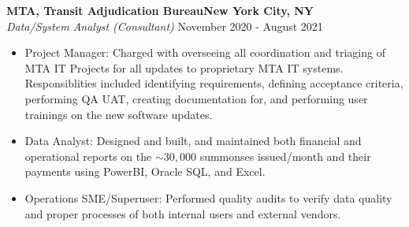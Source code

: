 \documentclass[a4paper]{article}
\begin{document}
\textbf{MTA, Transit Adjudication Bureau\hfill New York City, NY}\\
\textit{Data/System Analyst (Consultant)} \hfill November 2020 - August 2021\\
\vspace{-1mm}
\begin{itemize} \itemsep 1pt
    \item Project Manager: Charged with overseeing all coordination and triaging of MTA IT Projects for all updates to proprietary MTA IT systems.
            Responsiblities included identifying requirements, defining acceptance criteria, performing QA UAT, creating documentation for, and performing user trainings on the new software updates.
	\item Data Analyst: Designed and built, and maintained both financial and operational reports on the $\sim 30,000$ summonses issued/month and their payments using PowerBI, Oracle SQL, and Excel.
    \item Operations SME/Superuser: Performed quality audits to verify data quality and proper processes of both internal users and external vendors.
\end{itemize}
\end{document}

